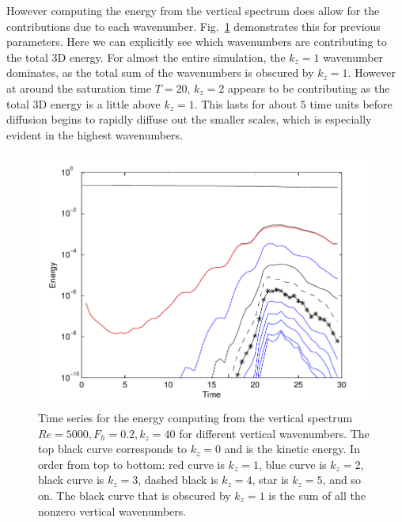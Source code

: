 However computing the energy from the vertical spectrum does allow for the contributions due to each wavenumber. Fig.~\ref{other_kz} demonstrates this for previous parameters. Here we can explicitly see which wavenumbers are contributing to the total 3D energy. For almost the entire simulation, the $k_{z}=1$ wavenumber dominates, as the total sum of the wavenumbers is obscured by $k_{z}=1$. However at around the saturation time $T=20$, $k_{z}=2$ appears to be contributing as the total 3D energy is a little above $k_{z}=1$. This lasts for about $5$ time units before diffusion begins to rapidly diffuse out the smaller scales, which is especially evident in the highest wavenumbers. 
\begin{figure}
\begin{center}
\includegraphics[width=\textwidth]{other_kz}
\caption{Time series for the energy computing from the vertical spectrum $Re=5000, F_{h}=0.2, k_{z}=40$ for different vertical wavenumbers. The top black curve corresponds to $k_{z}=0$ and is the kinetic energy. In order from top to bottom: red curve is $k_{z}=1$, blue curve is $k_{z}=2$, black curve is $k_{z}=3$, dashed black is $k_{z}=4$, star is $k_{z}=5$, and so on. The black curve that is obscured by $k_{z}=1$ is the sum of all the nonzero vertical wavenumbers.}
\label{other_kz}
\end{center}
\end{figure}

